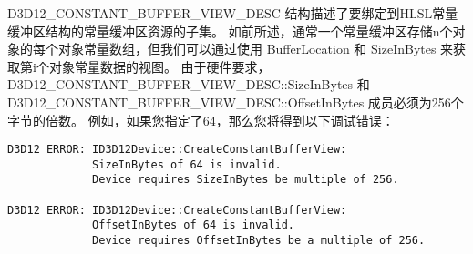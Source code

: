 \begin{flushleft}
D3D12\_CONSTANT\_BUFFER\_VIEW\_DESC 结构描述了要绑定到HLSL常量缓冲区结构的常量缓冲区资源的子集。 如前所述，通常一个常量缓冲区存储n个对象的每个对象常量数组，但我们可以通过使用 BufferLocation 和 SizeInBytes 来获取第i个对象常量数据的视图。 由于硬件要求，D3D12\_CONSTANT\_BUFFER\_VIEW\_DESC::SizeInBytes 和D3D12\_CONSTANT\_BUFFER\_VIEW\_DESC::OffsetInBytes 成员必须为256个字节的倍数。 例如，如果您指定了64，那么您将得到以下调试错误：\\
\end{flushleft}
\begin{lstlisting}
D3D12 ERROR: ID3D12Device::CreateConstantBufferView: 
             SizeInBytes of 64 is invalid. 
             Device requires SizeInBytes be multiple of 256.

D3D12 ERROR: ID3D12Device::CreateConstantBufferView: 
             OffsetInBytes of 64 is invalid. 
             Device requires OffsetInBytes be a multiple of 256.
\end{lstlisting}

